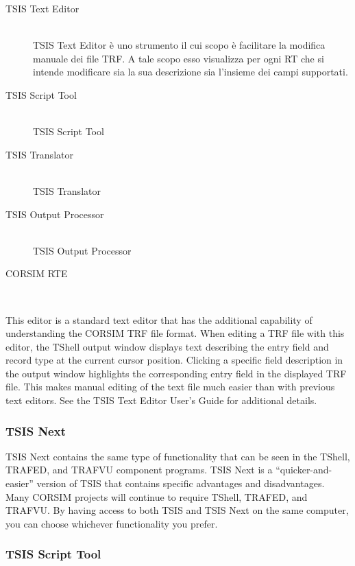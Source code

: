 \begin{description}
\item[TSIS Text Editor] \hfill \\
\acs{TSIS} Text Editor è uno strumento il cui scopo è facilitare la modifica manuale dei file \acs{TRF}. A tale scopo esso visualizza per ogni \acs{RT} che si intende modificare sia la sua descrizione sia l'insieme dei campi supportati.
\item[TSIS Script Tool] \hfill \\
\acs{TSIS} Script Tool
\item[TSIS Translator] \hfill \\
\acs{TSIS} Translator
\item[TSIS Output Processor] \hfill \\
\acs{TSIS} Output Processor
\item[CORSIM RTE] \hfill \\

\end{description}

This editor is a standard text editor that has the additional capability of understanding the CORSIM TRF file
format. When editing a TRF file with this editor, the TShell output window displays text describing the entry field
and record type at the current cursor position. Clicking a specific field description in the output window highlights
the corresponding entry field in the displayed TRF file. This makes manual editing of the text file much easier than
with previous text editors. See the TSIS Text Editor User's Guide for additional details.


\subsubsection{TSIS Next}

TSIS Next contains the same type of functionality that can be seen in the TShell, TRAFED, and TRAFVU
component programs. TSIS Next is a “quicker-and-easier” version of TSIS that contains specific advantages and
disadvantages. Many CORSIM projects will continue to require TShell, TRAFED, and TRAFVU. By having
access to both TSIS and TSIS Next on the same computer, you can choose whichever functionality you prefer.

\subsubsection{TSIS Script Tool}

